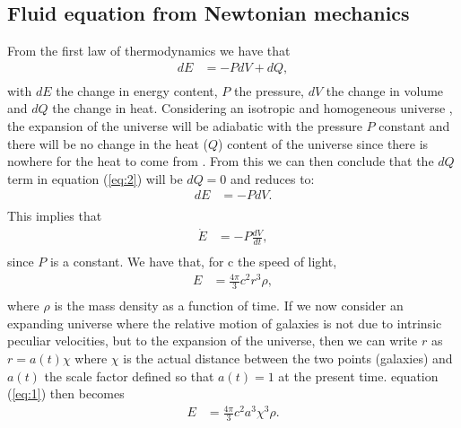 \documentclass[a4paper, 11pt]{FSKH_623_Report}
\numberwithin{equation}{section}
\newcommand{\driv}[2]{\frac{d #1}{d #2}}
\begin{document}
\subsection{Fluid equation from Newtonian mechanics}

From the first law of thermodynamics we have that  
\begin{equation}\label{eq:2}
\begin{split}
dE &= -PdV + dQ,\\
\end{split}
\end{equation}
with $dE$ the change in energy content, $P$ the pressure, $dV$ the change in volume and $dQ$ the change in heat.
Considering an isotropic and homogeneous universe \citep{notes4}, the expansion of the universe will be adiabatic with the pressure $P$ constant and there will be no change in the heat ($Q$) content of the universe since there is nowhere for the heat to come from \citep{notes4}. From this we can then conclude that the $dQ$ term in equation (\ref{eq:2}) will be $dQ=0$ and reduces to:
\begin{equation}
\begin{split}
dE &= -PdV. \\
\end{split}
\end{equation}
This implies that
\begin{equation}\label{eq:3}
\begin{split}
\dot{E} &= -P\driv{V}{t} ,            \\
\end{split}
\end{equation}
since $P$ is a constant.
We have that, for c the speed of light, 
\begin{equation}\label{eq:1}
\begin{split}
E &=\frac{4\pi}{3}c^{2}r^{3}\rho,\\
\end{split}
\end{equation}
where $\rho$ is the mass density as a function of time.
If we now consider an expanding universe where the relative motion of galaxies is not due to intrinsic peculiar velocities, but to the expansion of the universe, then we can write $r$ as $r=a(t)\chi$ where $\chi$ is the actual distance between the two points (galaxies) and $a(t)$ the scale factor defined so that $a(t)=1$ at the present time. equation (\ref{eq:1}) then becomes
\begin{equation}\label{eq:Stuff1}
\begin{split}
E &=\frac{4\pi}{3}c^{2}a^{3}\chi^{3}\rho.\\
\end{split}
\end{equation}
\end{document}
